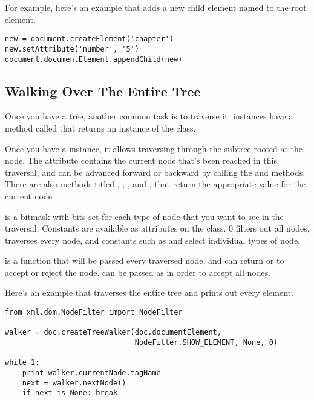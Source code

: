 \documentclass{howto}
\begin{document}
For example, here's an example that adds a new child element named
 to the root element.

\begin{verbatim}
new = document.createElement('chapter')
new.setAttribute('number', '5')
document.documentElement.appendChild(new)
\end{verbatim}


\subsection{Walking Over The Entire Tree}

Once you have a tree, another common task is to traverse it.
 instances have a method called
 that returns an instance of the
 class.

Once you have a  instance, it allows traversing
through the subtree rooted at the  node.  The
 attribute contains the current node that's been
reached in this traversal, and can be advanced forward or backward by
calling the  and  methods.
There are also methods titled ,
, , and
,  that return the
appropriate value for the current node.

 is a bitmask with bits set for each type of node that
you want to see in the traversal.  Constants are available 
as attributes on the  class.
0 filters out all nodes,  traverses
every node, and constants such as 
and  select individual types of node.

 is a function that will be passed every traversed node,
and can return  or
 to accept or reject the node.
 can be passed as  in order to accept all
nodes.


Here's an example that traverses the entire tree and prints out every
element.

\begin{verbatim}
from xml.dom.NodeFilter import NodeFilter

walker = doc.createTreeWalker(doc.documentElement,
                              NodeFilter.SHOW_ELEMENT, None, 0)

while 1:
    print walker.currentNode.tagName
    next = walker.nextNode()
    if next is None: break
\end{verbatim}
\end{document}
